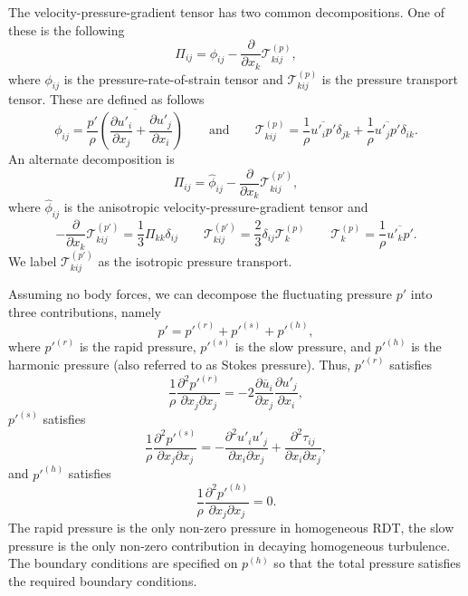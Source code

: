 \documentclass[oneside,a4paper,11pt]{report}
\newcommand{\uavg}{\overline{u}}
\newcommand{\pfluc}{p'}
\newcommand{\ufluc}{u'}
\newcommand{\rs}{\tau}          %
\newcommand{\redi}{\phi}        %
\begin{document}
The velocity-pressure-gradient tensor has two common decompositions. One of these is the following
\begin{equation}
\Pi_{ij} = \redi_{ij} - \frac{\partial}{\partial x_k} \mathcal{T}^{(p)}_{kij},
\end{equation}
where $\redi_{ij}$ is the pressure-rate-of-strain tensor and $\mathcal{T}^{(p)}_{kij}$ is the pressure transport tensor. These are defined as follows
\begin{equation}
\redi_{ij} = \overline{ \frac{\pfluc}{\rho} \left ( \frac{\partial \ufluc_i}{\partial x_j} + \frac{\partial \ufluc_j}{\partial x_i} \right ) } \qquad \text{and} \qquad \mathcal{T}^{(p)}_{kij} = \frac{1}{\rho} \overline{ \ufluc_i \pfluc } \delta_{jk} + \frac{1}{\rho} \overline{ \ufluc_j \pfluc } \delta_{ik}.
\end{equation}
An alternate decomposition is
\begin{equation}
\Pi_{ij} = \hat{\redi}_{ij} - \frac{\partial}{\partial x_k} \mathcal{T}^{(p')}_{kij},
\end{equation}
where $\hat{\redi}_{ij}$ is the anisotropic velocity-pressure-gradient tensor and
\begin{equation}
- \frac{\partial}{\partial x_k} \mathcal{T}^{(p')}_{kij} = \frac{1}{3} \Pi_{kk} \delta_{ij} \qquad
\mathcal{T}^{(p')}_{kij} =  \frac{2}{3} \delta_{ij} \mathcal{T}^{(p)}_k \qquad
\mathcal{T}^{(p)}_{k} = \frac{1}{\rho} \overline{ \ufluc_k \pfluc }.
\end{equation}
We label $\mathcal{T}^{(p')}_{kij}$ as the isotropic pressure transport.

Assuming no body forces, we can decompose the fluctuating pressure $\pfluc$ into three contributions, namely
\begin{equation}
\pfluc = \pfluc^{(r)} + \pfluc^{(s)} + \pfluc^{(h)},
\end{equation}
where $\pfluc^{(r)}$ is the rapid pressure, $\pfluc^{(s)}$ is the slow pressure, and $\pfluc^{(h)}$ is the harmonic pressure (also referred to as Stokes pressure). Thus, $\pfluc^{(r)}$ satisfies
\begin{equation}
\frac{1}{\rho} \frac{\partial^2 \pfluc^{(r)}}{\partial x_j \partial x_j} = -2 \frac{\partial \uavg_i}{\partial x_j} \frac{\partial \ufluc_j}{\partial x_i},
\end{equation}
$\pfluc^{(s)}$ satisfies
\begin{equation}
\frac{1}{\rho} \frac{\partial^2 \pfluc^{(s)}}{\partial x_j \partial x_j} = - \frac{\partial^2 \ufluc_i \ufluc_j}{\partial x_i \partial x_j} + \frac{\partial^2 \rs_{ij}}{\partial x_i \partial x_j},
\end{equation}
and $\pfluc^{(h)}$ satisfies
\begin{equation}
\frac{1}{\rho} \frac{\partial^2 \pfluc^{(h)}}{\partial x_j \partial x_j} = 0.
\end{equation}
The rapid pressure is the only non-zero pressure in homogeneous RDT, the slow pressure is the only non-zero contribution in decaying homogeneous turbulence. The boundary conditions are specified on $p^{(h)}$ so that the total pressure satisfies the required boundary conditions.
\end{document}
